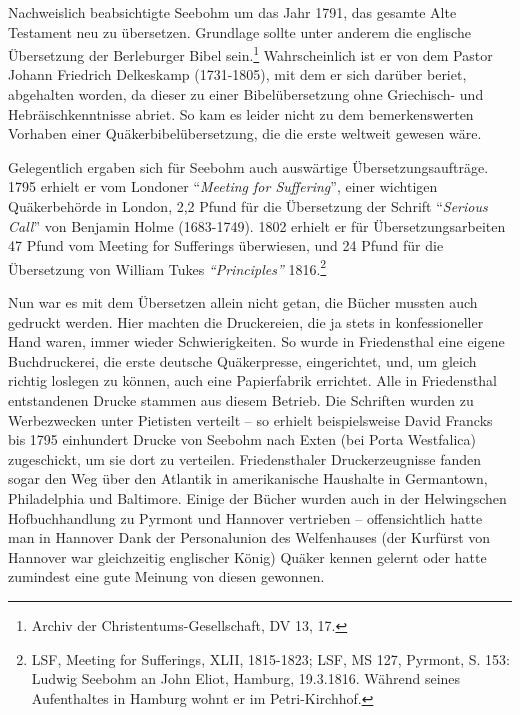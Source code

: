 \medskip

Nachweislich beabsichtigte Seebohm um das Jahr 1791, das gesamte Alte Testament
neu zu übersetzen. Grundlage sollte unter anderem die englische Übersetzung der
Berleburger Bibel sein.\footnote{Archiv
der Christentums-Gesellschaft, DV 13, 17.} Wahrscheinlich ist er von dem Pastor
Johann Friedrich Delkeskamp
(1731-1805), mit dem er sich darüber beriet, abgehalten worden, da dieser zu
einer Bibelübersetzung ohne Griechisch- und
Hebräischkenntnisse abriet. So kam es leider nicht zu dem bemerkenswerten
Vorhaben einer Quäkerbibelübersetzung, die die erste weltweit gewesen wäre.

\medskip

Gelegentlich ergaben sich für Seebohm auch auswärtige Übersetzungsaufträge. 1795
erhielt er vom Londoner "`\textit{Meeting for Suffering}"', einer wichtigen Quäkerbehörde in London, 2,2
Pfund für die Übersetzung der Schrift "`\textit{Serious Call}"' von Benjamin
Holme (1683-1749). 1802 erhielt er für
Übersetzungsarbeiten 47 Pfund vom Meeting for Sufferings überwiesen, und 24
Pfund für die Übersetzung von William Tukes \textit{"`Principles"'} 1816.\footnote{LSF,
Meeting for Sufferings, XLII, 1815-1823; LSF, MS 127, Pyrmont, S. 153:
Ludwig Seebohm an John Eliot, Hamburg, 19.3.1816. Während seines Aufenthaltes in
Hamburg wohnt er im Petri-Kirchhof.}

\medskip

Nun war es mit dem Übersetzen allein nicht getan, die Bücher mussten auch
gedruckt werden. Hier machten die Druckereien, die ja stets in
konfessioneller Hand waren, immer wieder Schwierigkeiten. So wurde in
Friedensthal eine eigene Buchdruckerei, die erste deutsche
Quäkerpresse, eingerichtet, und, um gleich
richtig loslegen zu können, auch eine Papierfabrik
errichtet. Alle in Friedensthal entstandenen Drucke stammen aus diesem Betrieb.
Die Schriften wurden zu Werbezwecken unter Pietisten
verteilt -- so erhielt beispielsweise David Francks bis 1795 einhundert Drucke von Seebohm nach Exten (bei
Porta Westfalica) zugeschickt, um sie dort zu
verteilen. Friedensthaler Druckerzeugnisse fanden sogar den Weg über den
Atlantik in amerikanische Haushalte in Germantown,
Philadelphia und Baltimore.
Einige der Bücher wurden auch in der Helwingschen Hofbuchhandlung zu Pyrmont und
Hannover vertrieben -- offensichtlich hatte man in
Hannover Dank der Personalunion des Welfenhauses
(der Kurfürst von Hannover war gleichzeitig englischer König) Quäker kennen
gelernt oder hatte zumindest eine gute Meinung von diesen gewonnen.


